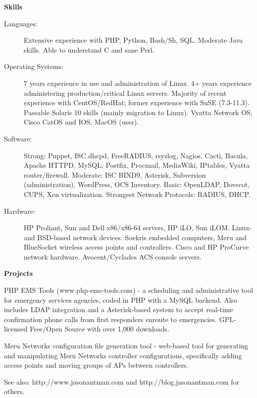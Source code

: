 \documentclass[letterpaper,11pt]{article}
\newcommand{\resheading}[1]{{\large \colorbox{mygrey}{\begin{minipage}{\textwidth}{\textbf{#1 \vphantom{p\^{E}}}}\end{minipage}}}}
\begin{document}
\resheading{Skills}

\begin{description}
\item[Languages:]
Extensive experience with PHP, Python, Bash/Sh, SQL. Moderate Java
skills. Able to understand C and sane Perl.
\item[Operating Systems:]
7 years experience in use and administration of Linux. 4+ years experience administering production/critical Linux servers.
Majority of recent experience with CentOS/RedHat; former experience with SuSE
(7.3-11.3). Passable Solaris 10 skills (mainly migration to Linux). Vyatta Network OS, Cisco CatOS and IOS. MacOS (user).
\item[Software:]
Strong: Puppet, ISC dhcpd, FreeRADIUS, rsyslog, Nagios, Cacti, Bacula, Apache HTTPD, MySQL, Postfix, Procmail, MediaWiki, IPtables, Vyatta router/firewall. Moderate: ISC BIND9, Asterisk, Subversion (administration), WordPress, OCS Inventory. Basic: OpenLDAP, Dovecot, CUPS, Xen virtualization. Strongest Network Protocols: RADIUS, DHCP.


\item[Hardware:]
HP Proliant, Sun and Dell x86/x86-64 servers, HP iLO, Sun iLOM. Linux- and
BSD-based network devices. Soekris embedded computers, Meru and BlueSocket
wireless access points and controllers. Cisco and HP ProCurve network hardware. Avocent/Cyclades ACS console servers.
\end{description}


\resheading{Projects}

\begin{description}
\item[2007--Present:] PHP EMS Tools (www.php-ems-tools.com) - a scheduling and
  administrative tool for emergency services agencies, coded in PHP with a MySQL
  backend. Also includes LDAP integration and a Asterisk-based system to accept
  real-time confirmation phone calls from first responders enroute to
  emergencies. GPL-licensed Free/Open Source with over 1,000 downloads.
\item[In Progress] Meru Networks configuration file generation tool - web-based tool
  for generating and manipulating Meru Networks controller configurations, specifically
  adding access points and moving groups of APs between controllers.
\item See also: http://www.jasonantman.com and http://blog.jasonantman.com for others.

\end{description}
\end{document}
